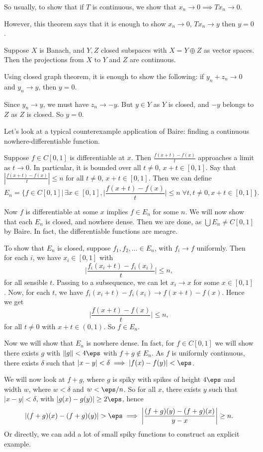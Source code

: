 \documentclass[12pt]{article}
\begin{document}
So usually, to show that if $T$ is continuous, we show that $x_n \to 0 \implies T x_n \to 0$.

However, this theorem says that it is enough to show $x_n \to 0$, $T x_n \to y$ then $y = 0$.

\begin{exbox}
	Suppose $X$ is Banach, and $Y, Z$ closed subspaces with $X = Y \oplus Z$ as vector spaces. Then the projections from $X$ to $Y$ and $Z$ are continuous.

	Using closed graph theorem, it is enough to show the following: if $y_n + z_n \to 0$ and $y_n \to y$, then $y = 0$.

	Since $y_n \to y$, we must have $z_n \to -y$. But $y \in Y$ as $Y$ is closed, and $-y$ belongs to $Z$ as $Z$ is closed. So $y = 0$.
\end{exbox}

Let's look at a typical counterexample application of Baire: finding a continuous nowhere-differentiable function.

\begin{exbox}
Suppose $f \in C[0,1]$ is differentiable at $x$. Then $\frac{f(x+t)-f(x)}{t}$ approaches a limit as $t \to 0$. In particular, it is bounded over all $t \neq 0$, $x + t \in [0,1]$. Say that $|\frac{f(x+t)-f(x)}{t}| \leq n$ for all $t \neq 0$, $x + t \in [0,1]$. Then we can define
\[
	E_n = \biggl\{f \in C[0,1] \Big| \,\exists x \in [0,1], \biggl| \frac{f(x+t)-f(x)}{t} \biggr| \leq n \;\forall t, t \neq 0, x + t \in [0,1]\biggr\}.
\]

Now $f$ is differentiable at some $x$ implies $f \in E_n$ for some $n$. We will now show that each $E_n$ is closed, and nowhere dense. Then we are done, as $\bigcup E_n \neq C[0,1]$ by Baire. In fact, the differentiable functions are meagre.

To show that $E_n$ is closed, suppose $f_1, f_2, \ldots \in E_n$, with $f_i \to f$ uniformly. Then for each $i$, we have $x_i \in [0,1]$ with
\[
\biggl|\frac{f_i(x_i+t)-f_i(x_i)}{t}\biggr| \leq n,
\]
for all sensible $t$. Passing to a subsequence, we can let $x_i \to x$ for some $x \in [0,1]$. Now, for each $t$, we have $f_i(x_i + t) - f_i(x_i) \to f(x+t) - f(x)$. Hence we get
\[
\biggl| \frac{f(x+t) - f(x)}{t} \biggr| \leq n,
\]
for all $t \neq 0$ with $x + t \in (0,1)$. So $f \in E_n$.

Now we will show that $E_n$ is nowhere dense. In fact, for $f \in C[0,1]$ we will show there exists $g$ with $\|g\| < 4 \eps$ with $f + g \not \in E_n$. As $f$ is uniformly continuous, there exists $\delta$ such that $|x-y| < \delta \implies |f(x) - f(y)| < \eps$.

We will now look at $f + g$, where $g$ is spiky with spikes of height $4 \eps$ and width $w$, where $w < \delta$ and $w < \eps/n$. So for all  $x$, there exists $y$ such that $|x-y| < \delta$, with $|g(x) - g(y)| \ge 2 \eps$, hence
\[
|(f+g)(x) - (f+g)(y)| > \eps \implies \biggl|\frac{(f+g)(y) - (f+g)(x)}{y - x}\biggr| \ge n.
\]
Or directly, we can add a lot of small spiky functions to construct an explicit example.
\end{exbox}
\end{document}
